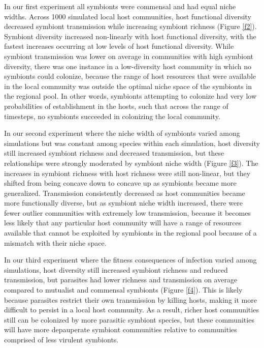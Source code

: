\documentclass[12pt]{article}
\begin{document}
In our first experiment all symbionts were commensal and had equal niche widths. 
Across 1000 simulated local host communities, host functional diversity decreased symbiont transmission while increasing symbiont richness (Figure \ref{f2}). 
Symbiont diversity increased non-linearly with host functional diversity, with the fastest increases occurring at low levels of host functional diversity. 
While symbiont transmission was lower on average in communities with high symbiont diversity, there was one instance in a low-diversity host community in which no symbionts could colonize, because the range of host resources that were available in the local community was outside the optimal niche space of the symbionts in the regional pool. 
In other words, symbionts attempting to colonize had very low probabilities of establishment in the hosts, such that across the range of timesteps, no symbionts succeeded in colonizing the local community. 

In our second experiment where the niche width of symbionts varied among simulations but was constant among species within each simulation, host diversity still increased symbiont richness and decreased transmission, but these relationships were strongly moderated by symbiont niche width (Figure \ref{f3}). 
The increases in symbiont richness with host richness were still non-linear, but they shifted from being concave down to concave up as symbionts became more generalized. 
Transmission consistently decreased as host communities became more functionally diverse, but as symbiont niche width increased, there were fewer outlier communities with extremely low transmission, because it becomes less likely that any particular host community will have a range of resources available that cannot be exploited by symbionts in the regional pool because of a mismatch with their niche space.

In our third experiment where the fitness consequences of infection varied among simulations, host diversity still increased symbiont richness and reduced transmission, but parasites had lower richness and transmission on average compared to mutualist and commensal symbionts (Figure \ref{f4}). 
This is likely because parasites restrict their own transmission by killing hosts, making it more difficult to persist in a local host community. 
As a result, richer host communities still can be colonized by more parasitic symbiont species, but these communities will have more depauperate symbiont communities relative to communities comprised of less virulent symbionts. 
\end{document}
